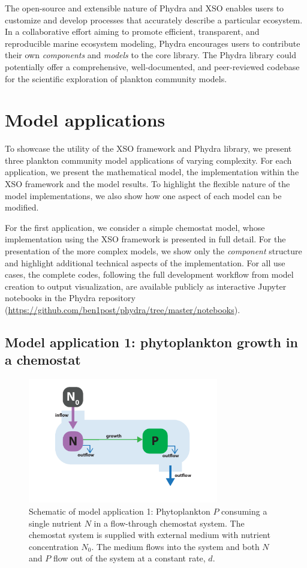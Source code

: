 \documentclass[gmd, manuscript]{copernicus}
\begin{document}
The open-source and extensible nature of Phydra and XSO enables users to customize and develop processes that accurately describe a particular ecosystem. In a collaborative effort aiming to promote efficient, transparent, and reproducible marine ecosystem modeling, Phydra encourages users to contribute their own \textit{components} and \textit{models} to the core library. The Phydra library could potentially offer a comprehensive, well-documented, and peer-reviewed codebase for the scientific exploration of plankton community models.

\section{Model applications} \label{Section:UseCases}

To showcase the utility of the XSO framework and Phydra library, we present three plankton community model applications of varying complexity. For each application, we present the mathematical model, the implementation within the XSO framework and the model results. To highlight the flexible nature of the model implementations, we also show how one aspect of each model can be modified.

For the first application, we consider a simple chemostat model, whose implementation using the XSO framework is presented in full detail. For the presentation of the more complex models, we show only the \textit{component} structure and highlight additional technical aspects of the implementation. For all use cases, the complete codes, following the full development workflow from model creation to output visualization, are available publicly as interactive Jupyter notebooks in the Phydra repository (\url{https://github.com/ben1post/phydra/tree/master/notebooks}).

\subsection{Model application 1: phytoplankton growth in a chemostat}
\begin{figure}[t]
\includegraphics[width=8.3cm]{Figures/firstdraft_schematics/01_schematics_Chemostat.pdf}
\caption{Schematic of model application 1: Phytoplankton $P$ consuming a single nutrient $N$ in a flow-through chemostat system. The chemostat system is supplied with external medium with nutrient concentration $N_0$. The medium flows into the system and both $N$ and $P$ flow out of the system at a constant rate, $d$.}
\label{Figure:ModelSchematics_1}
\end{figure}
\end{document}
